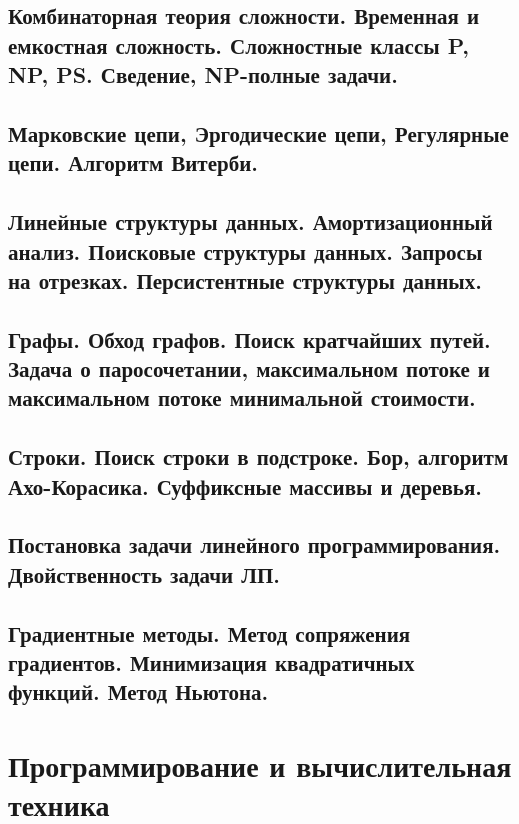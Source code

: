 \documentclass{article}
\begin{document}
\subsection{Комбинаторная теория сложности. Временная и емкостная сложность. Сложностные классы P, NP, PS. Сведение, NP-полные задачи.}

\subsection{Марковские цепи, Эргодические цепи, Регулярные цепи. Алгоритм Витерби.}

\subsection{Линейные структуры данных. Амортизационный анализ. Поисковые структуры данных. Запросы на отрезках. Персистентные структуры данных.}

\subsection{Графы. Обход графов. Поиск кратчайших путей. Задача о паросочетании, максимальном потоке и максимальном потоке минимальной стоимости.}

\subsection{Строки. Поиск строки в подстроке. Бор, алгоритм Ахо-Корасика. Суффиксные массивы и деревья.}

\subsection{Постановка задачи линейного программирования. Двойственность задачи ЛП.}

\subsection{Градиентные методы. Метод сопряжения градиентов. Минимизация квадратичных функций. Метод Ньютона.}

\newpage

\section{Программирование и вычислительная техника}




\end{document}
